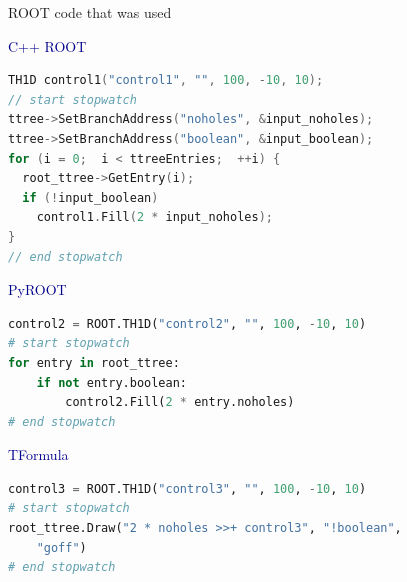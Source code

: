 \documentclass{beamer}
\begin{document}
\begin{frame}[fragile]{ROOT code that was used}

\vspace{0.3 cm}
\hfill \textcolor{darkblue}{C++ ROOT}

\vspace{-0.5 cm}
\begin{minipage}{0.8\linewidth}
\begin{lstlisting}[language=cpp]
TH1D control1("control1", "", 100, -10, 10);
// start stopwatch
ttree->SetBranchAddress("noholes", &input_noholes);
ttree->SetBranchAddress("boolean", &input_boolean);
for (i = 0;  i < ttreeEntries;  ++i) {
  root_ttree->GetEntry(i);
  if (!input_boolean)
    control1.Fill(2 * input_noholes);
}
// end stopwatch
\end{lstlisting}
\end{minipage}

\hfill \textcolor{darkblue}{PyROOT}

\vspace{-0.5 cm}
\begin{minipage}{0.8\linewidth}
\begin{lstlisting}[language=python]
control2 = ROOT.TH1D("control2", "", 100, -10, 10)
# start stopwatch
for entry in root_ttree:
    if not entry.boolean:
        control2.Fill(2 * entry.noholes)
# end stopwatch
\end{lstlisting}
\end{minipage}

\hfill \textcolor{darkblue}{TFormula}

\vspace{-0.5 cm}
\begin{minipage}{0.8\linewidth}
\begin{lstlisting}[language=python]
control3 = ROOT.TH1D("control3", "", 100, -10, 10)
# start stopwatch
root_ttree.Draw("2 * noholes >>+ control3", "!boolean",
    "goff")
# end stopwatch
\end{lstlisting}
\end{minipage}
\end{frame}
\end{document}
